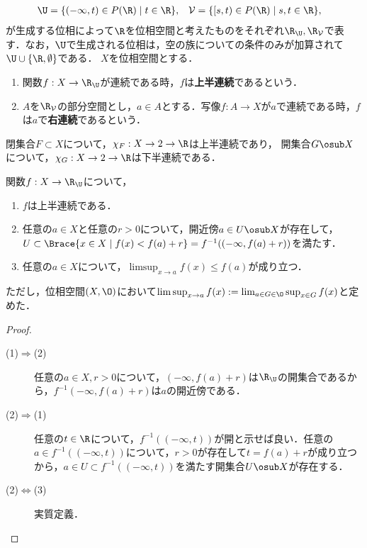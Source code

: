 \documentclass[uplatex,dvipdfmx]{jsreport}
\begin{document}
\begin{definition}
    \begin{align*}
        \U&=\{(-\infty,t)\in P(\R)\mid t\in\R\},&\mathcal{V}&=\{[s,t)\in P(\R)\mid s,t\in\R\},
    \end{align*}
    が生成する位相によって$\R$を位相空間と考えたものをそれぞれ$\R_\U,\R_\mathcal{V}$で表す．なお，$\U$で生成される位相は，空の族についての条件のみが加算されて$\U\cup\{\R,\emptyset\}$である．
    $X$を位相空間とする．
    \begin{enumerate}
        \item 関数$f:X\to\R_\U$が連続である時，$f$は\textbf{上半連続}であるという．
        \item $A$を$\R_\mathcal{V}$の部分空間とし，$a\in A$とする．写像$f:A\to X$が$a$で連続である時，$f$は$a$で\textbf{右連続}であるという．
    \end{enumerate}
\end{definition}
\begin{example}\label{exp-upper-semi-continuous}
    閉集合$F\subset X$について，$\chi_F:X\to2\to\R$は上半連続であり，
    開集合$G\osub X$について，$\chi_G:X\to2\to\R$は下半連続である．
\end{example}

\begin{lemma}[上半連続性の特徴付け]
    関数$f:X\to\R_\U$について，
    \begin{enumerate}
        \item $f$は上半連続である．
        \item 任意の$a\in X$と任意の$r>0$について，開近傍$a\in U\osub X$が存在して，$U\subset\Brace{x\in X\mid f(x)<f(a)+r}=f^{-1}((-\infty,f(a)+r))$を満たす．%
        \item 任意の$a\in X$について，$\limsup_{x\to a}f(x)\le f(a)$が成り立つ．
    \end{enumerate}
    ただし，位相空間$(X,\O)$において$\limsup_{x\to a}f(x):=\lim_{a\in G\in\O}\sup_{x\in G}f(x)$と定めた．
\end{lemma}
\begin{proof}\mbox{}
    \begin{description}
        \item[(1)$\Rightarrow$(2)] 
        任意の$a\in X,r>0$について，$(-\infty,f(a)+r)$は$\R_\U$の開集合であるから，$f^{-1}(-\infty,f(a)+r)$は$a$の開近傍である．
        \item[(2)$\Rightarrow$(1)]
        任意の$t\in\R$について，$f^{-1}((-\infty,t))$が開と示せば良い．任意の$a\in f^{-1}((-\infty,t))$について，$r>0$が存在して$t=f(a)+r$が成り立つから，$a\in U\subset f^{-1}((-\infty,t))$を満たす開集合$U\osub X$が存在する．
        \item[(2)$\Leftrightarrow$(3)] 実質定義．
    \end{description}
\end{proof}
\end{document}

